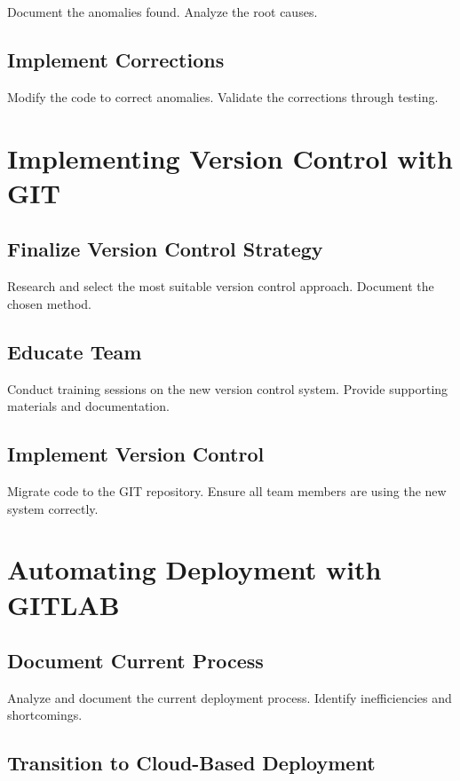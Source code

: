 Document the anomalies found.
Analyze the root causes.


\subsection{Implement Corrections}

Modify the code to correct anomalies.
Validate the corrections through testing.


\section{Implementing Version Control with GIT}

\subsection{Finalize Version Control Strategy}

Research and select the most suitable version control approach.
Document the chosen method.


\subsection{Educate Team}

Conduct training sessions on the new version control system.
Provide supporting materials and documentation.


\subsection{Implement Version Control}

Migrate code to the GIT repository.
Ensure all team members are using the new system correctly.


\section{Automating Deployment with GITLAB}

\subsection{Document Current Process}

Analyze and document the current deployment process.
Identify inefficiencies and shortcomings.


\subsection{Transition to Cloud-Based Deployment}

